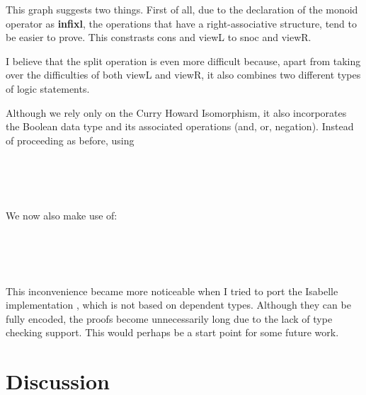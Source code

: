 \documentclass[12pt,twoside,notitlepage]{report}
\begin{document}
This graph suggests two things. First of all, due to the declaration of the monoid operator as \textbf{infixl}, the operations that have a right-associative structure, tend to be easier to prove. This constrasts cons and viewL to snoc and viewR. 

I believe that the split operation is even more difficult because, apart from taking over the difficulties of both viewL and viewR, it also combines two different types of logic statements. 

Although we rely only on the Curry Howard Isomorphism, it also incorporates the Boolean data type and its associated operations (and, or, negation). Instead of proceeding as before, using 
 
\begin{code}
\\
\>[0]\<[2]%
\>[2] \AgdaSymbol{:}     \<%
\\
\>[0]\<[2]%
\>[2] \AgdaSymbol{:}    \AgdaSymbol{(}   \AgdaSymbol{)}\<%
\\
\end{code} 

We now also make use of: 

\begin{code}
\\
\>[0]\<[2]%
\>[2] \AgdaSymbol{:}    \AgdaSymbol{(}   \AgdaSymbol{)}\<%
\\
\>[0]\<[2]%
\>[2] \AgdaSymbol{:}    \AgdaSymbol{(}   \AgdaSymbol{)}\<%
\\
\end{code}

This inconvenience became more noticeable when I tried to port the Isabelle implementation \cite{isabelle}, which is not based on dependent types. Although they can be fully encoded, the proofs become unnecessarily long due to the lack of type checking support. This would perhaps be a start point for some future work.

\section{Discussion}
\end{document}

